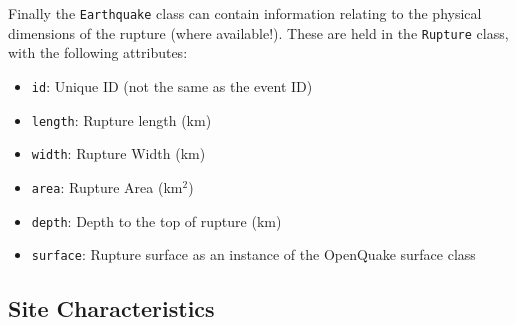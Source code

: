 Finally the \verb=Earthquake= class can contain information relating to the physical dimensions of the rupture (where available!). These are held in the \verb=Rupture= class, with the following attributes:
\begin{itemize}
\item \verb=id=: Unique ID (not the same as the event ID)
\item \verb=length=: Rupture length (km)
\item \verb=width=: Rupture Width (km)
\item \verb=area=: Rupture Area (km$^2$)
\item \verb=depth=: Depth to the top of rupture (km)
\item \verb=surface=: Rupture surface as an instance of the OpenQuake surface class
\end{itemize}


\subsection{Site Characteristics}

